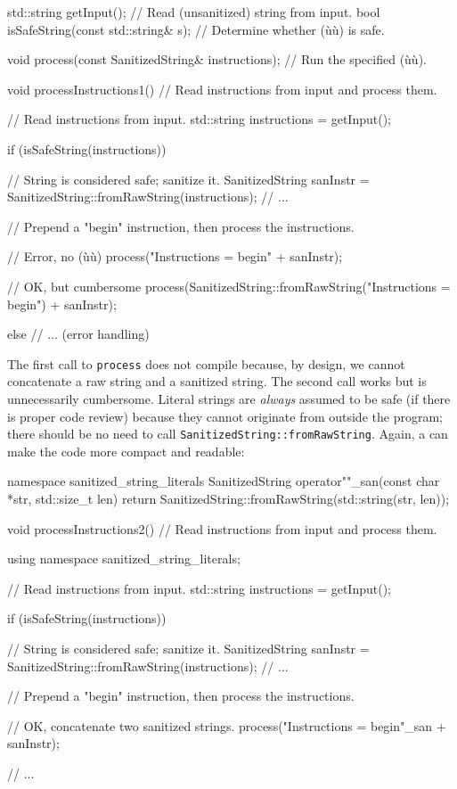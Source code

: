 \begin{emcppslisting}
std::string getInput();  // Read (unsanitized) string from input.
bool isSafeString(const std::string& s);  // Determine whether (ù{}ù) is safe.

void process(const SanitizedString& instructions);
    // Run the specified (ù{}ù).

void processInstructions1()
    // Read instructions from input and process them.
{
    // Read instructions from input.
    std::string instructions = getInput();

    if (isSafeString(instructions))
    {
       // String is considered safe; sanitize it.
       SanitizedString sanInstr = SanitizedString::fromRawString(instructions);
       // ...

       // Prepend a "begin" instruction, then process the instructions.

       // Error, no (ù{}ù)
       process("Instructions = begin\n" + sanInstr);

       // OK, but cumbersome
       process(SanitizedString::fromRawString("Instructions = begin\n") +
               sanInstr);
    }
    else
    {
        // ...                  (error handling)
    }
}
\end{emcppslisting}
    
\noindent The first call to \lstinline!process! does not compile because, by design,
we cannot concatenate a raw string and a sanitized string. The second
call works but is unnecessarily cumbersome. Literal strings are
\emph{always} assumed to be safe (if there is proper code review)
because they cannot originate from outside the program; there should be
no need to call \lstinline!SanitizedString::fromRawString!. Again, a
 can make the code more compact and readable:

\begin{emcppslisting}
namespace sanitized_string_literals
{
    SanitizedString operator""_san(const char *str, std::size_t len)
    {
        return SanitizedString::fromRawString(std::string(str, len));
    }
}

void processInstructions2()
    // Read instructions from input and process them.
{
    using namespace sanitized_string_literals;

    // Read instructions from input.
    std::string instructions = getInput();

    if (isSafeString(instructions))
    {
       // String is considered safe; sanitize it.
       SanitizedString sanInstr = SanitizedString::fromRawString(instructions);
       // ...

       // Prepend a "begin" instruction, then process the instructions.

       // OK, concatenate two sanitized strings.
       process("Instructions = begin\n"_san + sanInstr);
    }
    // ...
}
\end{emcppslisting}
    

